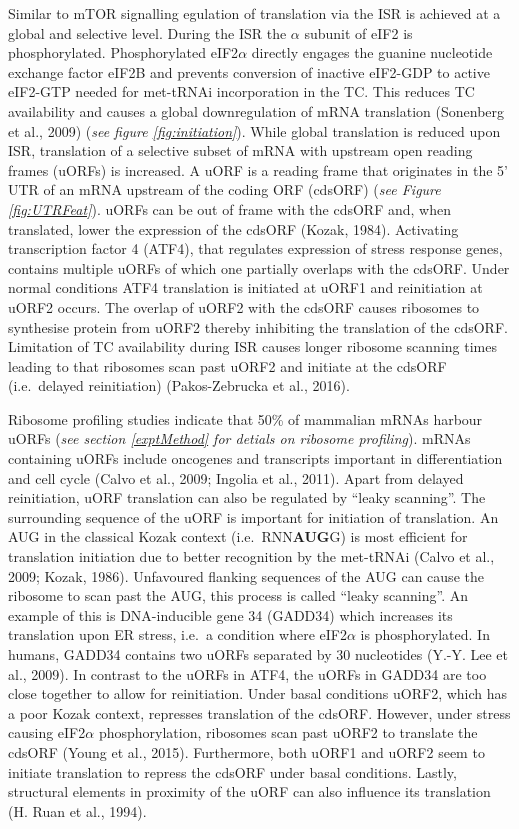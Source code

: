 \documentclass[12pt,openany]{book}
\begin{document}
Similar to mTOR signalling egulation of translation via the ISR is
achieved at a global and selective level. During the ISR the \(\alpha\)
subunit of eIF2 is phosphorylated. Phosphorylated eIF2\(\alpha\)
directly engages the guanine nucleotide exchange factor eIF2B and
prevents conversion of inactive eIF2-GDP to active eIF2-GTP needed for
met-tRNAi incorporation in the TC. This reduces TC availability and
causes a global downregulation of mRNA translation (Sonenberg et al.,
2009) (\emph{see figure \ref{fig:initiation}}). While global translation
is reduced upon ISR, translation of a selective subset of mRNA with
upstream open reading frames (uORFs) is increased. A uORF is a reading
frame that originates in the 5' UTR of an mRNA upstream of the coding
ORF (cdsORF) (\emph{see Figure \ref{fig:UTRFeat}}). uORFs can be out of
frame with the cdsORF and, when translated, lower the expression of the
cdsORF (Kozak, 1984). Activating transcription factor 4 (ATF4), that
regulates expression of stress response genes, contains multiple uORFs
of which one partially overlaps with the cdsORF. Under normal conditions
ATF4 translation is initiated at uORF1 and reinitiation at uORF2 occurs.
The overlap of uORF2 with the cdsORF causes ribosomes to synthesise
protein from uORF2 thereby inhibiting the translation of the cdsORF.
Limitation of TC availability during ISR causes longer ribosome scanning
times leading to that ribosomes scan past uORF2 and initiate at the
cdsORF (i.e.~delayed reinitiation) (Pakos-Zebrucka et al., 2016).

Ribosome profiling studies indicate that 50\% of mammalian mRNAs harbour
uORFs (\emph{see section \ref{exptMethod} for detials on ribosome
profiling}). mRNAs containing uORFs include oncogenes and transcripts
important in differentiation and cell cycle (Calvo et al., 2009; Ingolia
et al., 2011). Apart from delayed reinitiation, uORF translation can
also be regulated by ``leaky scanning''. The surrounding sequence of the
uORF is important for initiation of translation. An AUG in the classical
Kozak context (i.e.~RNN\textbf{AUG}G) is most efficient for translation
initiation due to better recognition by the met-tRNAi (Calvo et al.,
2009; Kozak, 1986). Unfavoured flanking sequences of the AUG can cause
the ribosome to scan past the AUG, this process is called ``leaky
scanning''. An example of this is DNA-inducible gene 34 (GADD34) which
increases its translation upon ER stress, i.e.~a condition where
eIF2\(\alpha\) is phosphorylated. In humans, GADD34 contains two uORFs
separated by 30 nucleotides (Y.-Y. Lee et al., 2009). In contrast to the
uORFs in ATF4, the uORFs in GADD34 are too close together to allow for
reinitiation. Under basal conditions uORF2, which has a poor Kozak
context, represses translation of the cdsORF. However, under stress
causing eIF2\(\alpha\) phosphorylation, ribosomes scan past uORF2 to
translate the cdsORF (Young et al., 2015). Furthermore, both uORF1 and
uORF2 seem to initiate translation to repress the cdsORF under basal
conditions. Lastly, structural elements in proximity of the uORF can
also influence its translation (H. Ruan et al., 1994).
\end{document}
